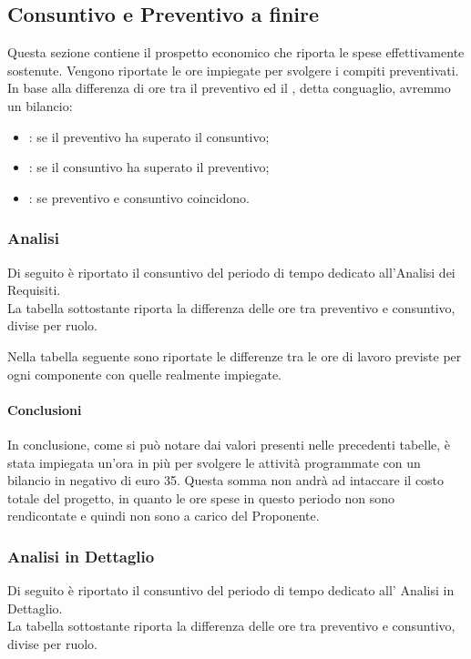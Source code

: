 \subsection{Consuntivo e Preventivo a finire}
Questa sezione contiene il prospetto economico che riporta le spese effettivamente sostenute. Vengono riportate le ore impiegate per svolgere i compiti preventivati. In base alla differenza di ore tra il preventivo ed il , detta conguaglio, avremmo un bilancio:
\begin{itemize}
\item {}: se il preventivo ha superato il consuntivo;
\item {}: se il consuntivo ha superato il preventivo;
\item {}: se preventivo e consuntivo coincidono.
\end{itemize}
\subsubsection{Analisi}
Di seguito è riportato il consuntivo del periodo di tempo dedicato all'Analisi dei Requisiti.\\
La tabella sottostante riporta la differenza delle ore tra preventivo e consuntivo, divise per ruolo.


Nella tabella seguente sono riportate le differenze tra le ore di lavoro previste per ogni componente con quelle realmente impiegate.


\paragraph{Conclusioni}
In conclusione, come si può notare dai valori presenti nelle precedenti tabelle, è stata impiegata un'ora in più per svolgere le attività programmate con un bilancio in negativo di euro 35. Questa somma non andrà ad intaccare il costo totale del progetto, in quanto le ore spese in questo periodo non sono rendicontate e quindi non sono a carico del Proponente.

\subsubsection{Analisi in Dettaglio}
Di seguito è riportato il consuntivo del periodo di tempo dedicato all' Analisi in Dettaglio.\\
La tabella sottostante riporta la differenza delle ore tra preventivo e consuntivo, divise per ruolo.

